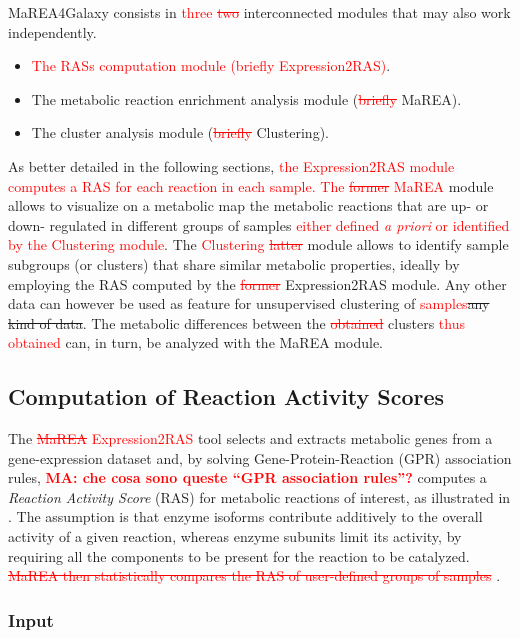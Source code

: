 \documentclass[preprint,12pt,authoryear]{elsarticle}
\newcommand{\red}{\textcolor{red}}
\newcommand{\mareagalaxy}{\textsf{MaREA4Galaxy}}
\newcommand{\mareaTool}{\textsf{MaREA}}
\newcommand{\clusterTool}{\textsf{Clustering}}
\newcommand{\RASTool}{\textsf{Expression2RAS}}
\begin{document}
\mareagalaxy{} consists in \red{three \sout{two}} interconnected
modules that may also work independently.
\begin{itemize}
\item \red{The RASs computation module (briefly \RASTool{})}.
\item The metabolic reaction enrichment analysis module
  (\red{\sout{briefly}} \mareaTool{}).
\item The cluster analysis module (\red{\sout{briefly}}
  \clusterTool{}).
\end{itemize}

As better detailed in the following sections, \red{the \RASTool{}
  module computes a RAS for each reaction in each sample. The
  \sout{former} \mareaTool{}} module allows to visualize on a
metabolic map the metabolic reactions that are up- or down- regulated
in different groups of samples \red{either defined \textit{a priori}
  or identified by the \clusterTool{} module}. The \red{\clusterTool{}
  \sout{latter}} module allows to identify sample subgroups (or
clusters) that share similar metabolic properties, ideally by
employing the RAS computed by the \red{\sout{former}} \RASTool{}
module. Any other data can however be used as feature for unsupervised
clustering of \red{samples}\sout{any kind of data}. The metabolic
differences between the \red{\sout{obtained}} clusters \red{thus
  obtained} can, in turn, be analyzed
with the \mareaTool{} module.


\subsection{Computation of Reaction Activity Scores}

The \red{\sout{\mareaTool{}} \RASTool{}} tool selects and extracts
metabolic genes from a gene-expression dataset and, by solving
Gene-Protein-Reaction (GPR) association rules, \red{\bfseries MA: che
  cosa sono queste ``GPR association rules''?} computes a
\emph{Reaction Activity Score} (RAS) for metabolic reactions of
interest, as illustrated in \citep{marea}. The assumption is that
enzyme isoforms contribute additively to the overall activity of a
given reaction, whereas enzyme subunits limit its activity, by
requiring all the components to be present for the reaction to be
catalyzed.
%
\red{\sout{\mareaTool{} then statistically compares the RAS of
    user-defined groups of samples}} \citep{marea}.


\subsubsection{Input}
\end{document}
